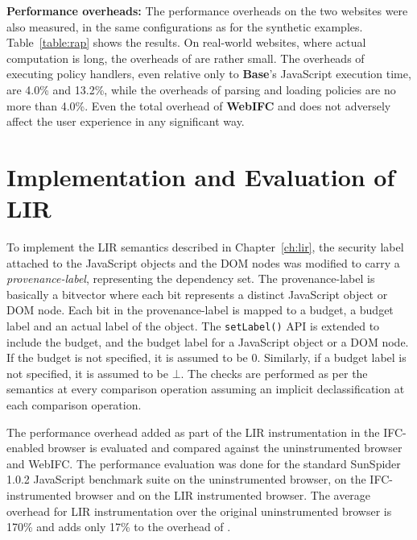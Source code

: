 \noindent
\textbf{Performance overheads:} The performance overheads 
on the two websites were also measured, in the same configurations as
for the synthetic examples. Table~\ref{table:rap} shows the
results. On real-world websites, where actual computation is long, the
overheads of {\sys} are rather small. The overheads of executing
policy handlers, even relative only to \textbf{Base}'s JavaScript
execution time, are 4.0\% and 13.2\%, while the overheads of parsing
and loading policies are no more than 4.0\%. Even the total overhead
of \textbf{WebIFC} and \textbf{\sys} does not adversely affect the user
experience in any significant way.

\section{Implementation and Evaluation of LIR}
\label{sec:impllir}

To implement the LIR semantics described in Chapter~\ref{ch:lir}, the
security label attached to the JavaScript objects and the DOM nodes
was modified to carry a \emph{provenance-label}, representing the dependency
set. The provenance-label is basically a bitvector where each bit
represents a distinct JavaScript object or DOM node. Each bit in the
provenance-label is mapped to a budget, a budget label and an actual
label of the object. The \texttt{setLabel()} API is extended to
include the budget, and the budget label for a JavaScript object or a
DOM node. If the budget is not specified, it is assumed to be
$0$. Similarly, if a budget label is not specified, it is assumed to
be $\bot$. The checks are performed as per the semantics at every
comparison operation assuming an implicit declassification at 
each comparison operation.

The performance overhead added as part of the LIR instrumentation in
the IFC-enabled browser is evaluated and compared against the
uninstrumented browser and WebIFC. 
The performance evaluation was done for the standard
SunSpider 1.0.2 JavaScript benchmark suite on the uninstrumented
browser, on the IFC-instrumented browser and on the LIR instrumented
browser. The average overhead for LIR instrumentation over the
original uninstrumented browser is 170\% and adds only 17\% to the
overhead of \sys.
